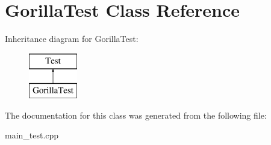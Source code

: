 \hypertarget{class_gorilla_test}{}\section{Gorilla\+Test Class Reference}
\label{class_gorilla_test}
Inheritance diagram for Gorilla\+Test\+:\begin{figure}[H]
\begin{center}
\leavevmode
\includegraphics[height=2.000000cm]{class_gorilla_test}
\end{center}
\end{figure}


The documentation for this class was generated from the following file\+:\begin{DoxyCompactItemize}
\item 
main\+\_\+test.\+cpp\end{DoxyCompactItemize}
